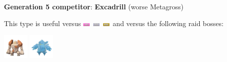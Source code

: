 \documentclass[8pt,aspectratio=169,compress]{beamer}
\newcommand{\fairyfull}{\includegraphics[height=0.15cm]{../../images/type/full/Fairy.png}}
\newcommand{\rockfull}{\includegraphics[height=0.15cm]{../../images/type/full/Rock.png}}
\newcommand{\steelfull}{\includegraphics[height=0.15cm]{../../images/type/full/Steel.png}}
\begin{document}
\begin{frame}
\begin{tiny}
\begin{block}{}
\begin{center}
\textbf{Generation 5 competitor}: \textbf{Excadrill} (worse Metagross)
\end{center}
\end{block}

\begin{block}{}\begin{center}
This type is useful versus \fairyfull~\steelfull~\rockfull~and versus the following raid bosses:

    \includegraphics[width=1.25cm]{../../images/pokemon/regirock.png}
    \includegraphics[width=1.25cm]{../../images/pokemon/regice.png}
\end{center}
\end{block}

\end{tiny}
\end{frame}



\end{document}
